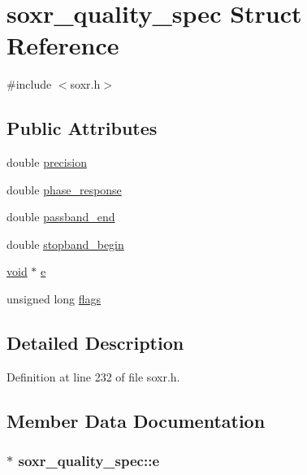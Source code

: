 \hypertarget{structsoxr__quality__spec}{}\section{soxr\+\_\+quality\+\_\+spec Struct Reference}
\label{structsoxr__quality__spec}


{\ttfamily \#include $<$soxr.\+h$>$}

\subsection*{Public Attributes}
\begin{DoxyCompactItemize}
\item 
double \hyperlink{structsoxr__quality__spec_a06805b7bfc9d7f273489e2bad228bcc8}{precision}
\item 
double \hyperlink{structsoxr__quality__spec_ad600c30fb76a8faf3ac1709d3ab08595}{phase\+\_\+response}
\item 
double \hyperlink{structsoxr__quality__spec_aac468916caf37b279bffc2f30d004fa8}{passband\+\_\+end}
\item 
double \hyperlink{structsoxr__quality__spec_a87bce61f87f57da23f63d9634a89975e}{stopband\+\_\+begin}
\item 
\hyperlink{sound_8c_ae35f5844602719cf66324f4de2a658b3}{void} $\ast$ \hyperlink{structsoxr__quality__spec_adbcdd5300a723d1614e2cc35e571efdc}{e}
\item 
unsigned long \hyperlink{structsoxr__quality__spec_a98847fe09120e95915753fa31363698e}{flags}
\end{DoxyCompactItemize}


\subsection{Detailed Description}


Definition at line 232 of file soxr.\+h.



\subsection{Member Data Documentation}
\subsubsection[{\texorpdfstring{e}{e}}]{$\ast$ soxr\+\_\+quality\+\_\+spec\+::e}\hypertarget{structsoxr__quality__spec_adbcdd5300a723d1614e2cc35e571efdc}{}\label{structsoxr__quality__spec_adbcdd5300a723d1614e2cc35e571efdc}



